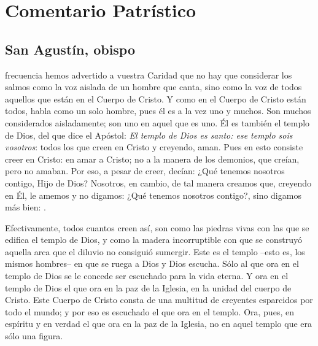 
\newsection
\section{Comentario Patrístico}

\subsection{San Agustín, obispo}

 

\begin{body}
 frecuencia hemos advertido a vuestra Caridad que no hay que considerar los salmos como la voz aislada de un hombre que canta, sino como la voz de todos aquellos que están en el Cuerpo de Cristo. Y como en el Cuerpo de Cristo están todos, habla como un solo hombre, pues él es a la vez uno y muchos. Son muchos considerados aisladamente; son uno en aquel que es uno. Él es también el templo de Dios, del que dice el Apóstol: \textit{El templo de Dios es santo: ese templo sois vosotros}: todos los que creen en Cristo y creyendo, aman. Pues en esto consiste creer en Cristo: en amar a Cristo; no a la manera de los demonios, que creían, pero no amaban. Por eso, a pesar de creer, decían: ¿Qué tenemos nosotros contigo, Hijo de Dios? Nosotros, en cambio, de tal manera creamos que, creyendo en Él, le amemos y no digamos: ¿Qué tenemos nosotros contigo?, sino digamos más bien: .

Efectivamente, todos cuantos creen así, son como las piedras vivas con las que se edifica el templo de Dios, y como la madera incorruptible con que se construyó aquella arca que el diluvio no consiguió sumergir. Este es el templo –esto es, los mismos hombres– en que se ruega a Dios y Dios escucha. Sólo al que ora en el templo de Dios se le concede ser escuchado para la vida eterna. Y ora en el templo de Dios el que ora en la paz de la Iglesia, en la unidad del cuerpo de Cristo. Este Cuerpo de Cristo consta de una multitud de creyentes esparcidos por todo el mundo; y por eso es escuchado el que ora en el templo. Ora, pues, en espíritu y en verdad el que ora en la paz de la Iglesia, no en aquel templo que era sólo una figura.


\end{body}
